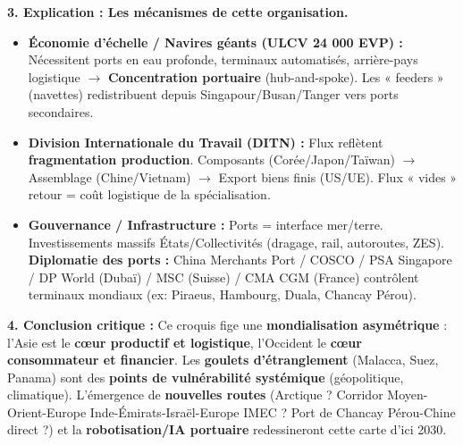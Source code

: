 \documentclass[11pt]{article}
\begin{document}
\begin{exoresolu}
    \textbf{3. Explication : Les mécanismes de cette organisation.}
    \begin{itemize}
        \item \textbf{Économie d'échelle / Navires géants (ULCV 24 000 EVP) :} Nécessitent ports en eau profonde, terminaux automatisés, arrière-pays logistique $\rightarrow$ \textbf{Concentration portuaire} (hub-and-spoke). Les « feeders » (navettes) redistribuent depuis Singapour/Busan/Tanger vers ports secondaires.
        \item \textbf{Division Internationale du Travail (DITN) :} Flux reflètent \textbf{fragmentation production}. Composants (Corée/Japon/Taïwan) $\rightarrow$ Assemblage (Chine/Vietnam) $\rightarrow$ Export biens finis (US/UE). Flux « vides » retour = coût logistique de la spécialisation.
        \item \textbf{Gouvernance / Infrastructure :} Ports = interface mer/terre. Investissements massifs États/Collectivités (dragage, rail, autoroutes, ZES). \textbf{Diplomatie des ports :} China Merchants Port / COSCO / PSA Singapore / DP World (Dubaï) / MSC (Suisse) / CMA CGM (France) contrôlent terminaux mondiaux (ex: Piraeus, Hambourg, Duala, Chancay Pérou).
    \end{itemize}
    
    \textbf{4. Conclusion critique :} Ce croquis fige une \textbf{mondialisation asymétrique} : l'Asie est le \textbf{cœur productif et logistique}, l'Occident le \textbf{cœur consommateur et financier}. Les \textbf{goulets d'étranglement} (Malacca, Suez, Panama) sont des \textbf{points de vulnérabilité systémique} (géopolitique, climatique). L'émergence de \textbf{nouvelles routes} (Arctique ? Corridor Moyen-Orient-Europe Inde-Émirats-Israël-Europe IMEC ? Port de Chancay Pérou-Chine direct ?) et la \textbf{robotisation/IA portuaire} redessineront cette carte d'ici 2030.
\end{exoresolu}
\end{document}
